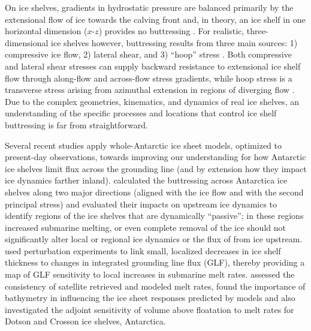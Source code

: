 \documentclass[tc, manuscript]{copernicus}
\begin{document}
On ice shelves, gradients in hydrostatic pressure are balanced primarily by the extensional flow of ice towards the calving front \citep{hutter1983, morland1987, schoof2007} and, in theory, an ice shelf in one horizontal dimension ($x$-$z$) provides no buttressing \citep{schoof2007,gudmundsson2013}. For realistic, three-dimensional ice shelves however,  buttressing results from three main sources: 1) compressive ice flow, 2) lateral shear, and 3) ``hoop'' stress \citep{pegler2012}. Both compressive and lateral shear stresses can supply backward resistance to extensional ice shelf flow through along-flow and across-flow stress gradients, while hoop stress is a transverse stress arising from azimuthal extension in regions of diverging flow \citep{wearing2016}.  Due to the complex geometries, kinematics, and dynamics of real ice shelves, an understanding of the specific processes and locations that control ice shelf buttressing is far from straightforward.



Several recent studies apply whole-Antarctic ice sheet models, optimized to present-day observations, towards improving our understanding for how Antarctic ice shelves limit flux across the grounding line (and by extension how they impact ice dynamics farther inland). \citet{furst2016} calculated the buttressing across Antarctica ice shelves along two major directions (aligned with the ice flow and with the second principal stress) and evaluated their impacts on upstream ice dynamics to identify regions of the ice shelves that are dynamically ``passive''; in these regions increased submarine melting, or even complete removal of the ice should not significantly alter local or regional ice dynamics or the flux of from ice upstream. \citet{reese2018} used perturbation experiments to link small, localized decreases in ice shelf thickness to changes in integrated grounding line flux (GLF), thereby providing a map of GLF sensitivity to local increases in submarine melt rates. \citet{Goldberg2019} assessed the consistency of satellite retrieved and modeled melt rates, found the importance of bathymetry in influencing the ice sheet responses predicted by models and also investigated the adjoint sensitivity of volume above floatation to melt rates for Dotson and Crosson ice shelves, Antarctica.
\end{document}
